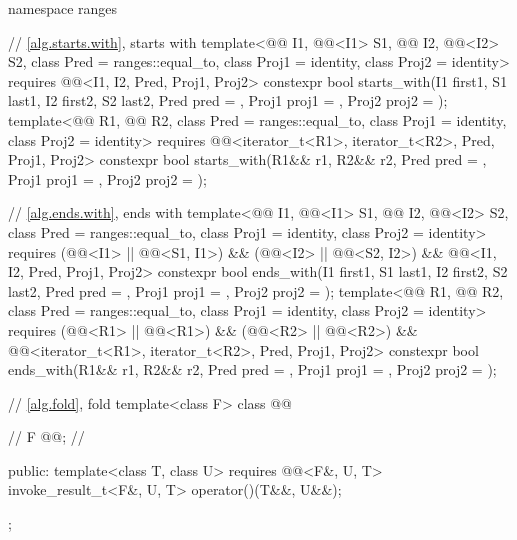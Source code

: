 \begin{codeblock}
{  namespace ranges {
    // \ref{alg.starts.with}, starts with
    template<@@ I1, @@<I1> S1, @@ I2, @@<I2> S2,
             class Pred = ranges::equal_to, class Proj1 = identity, class Proj2 = identity>
      requires @@<I1, I2, Pred, Proj1, Proj2>
      constexpr bool starts_with(I1 first1, S1 last1, I2 first2, S2 last2, Pred pred = {},
                                 Proj1 proj1 = {}, Proj2 proj2 = {});
    template<@@ R1, @@ R2, class Pred = ranges::equal_to,
             class Proj1 = identity, class Proj2 = identity>
      requires @@<iterator_t<R1>, iterator_t<R2>, Pred, Proj1, Proj2>
      constexpr bool starts_with(R1&& r1, R2&& r2, Pred pred = {},
                                 Proj1 proj1 = {}, Proj2 proj2 = {});

    // \ref{alg.ends.with}, ends with
    template<@@ I1, @@<I1> S1, @@ I2, @@<I2> S2,
             class Pred = ranges::equal_to, class Proj1 = identity, class Proj2 = identity>
      requires (@@<I1> || @@<S1, I1>) &&
               (@@<I2> || @@<S2, I2>) &&
               @@<I1, I2, Pred, Proj1, Proj2>
      constexpr bool ends_with(I1 first1, S1 last1, I2 first2, S2 last2, Pred pred = {},
                               Proj1 proj1 = {}, Proj2 proj2 = {});
    template<@@ R1, @@ R2, class Pred = ranges::equal_to,
             class Proj1 = identity, class Proj2 = identity>
      requires (@@<R1> || @@<R1>) &&
               (@@<R2> || @@<R2>) &&
               @@<iterator_t<R1>, iterator_t<R2>, Pred, Proj1, Proj2>
      constexpr bool ends_with(R1&& r1, R2&& r2, Pred pred = {},
                               Proj1 proj1 = {}, Proj2 proj2 = {});

    // \ref{alg.fold}, fold
    template<class F>
    class @@ {     // \expos
      F @@;              // \expos

    public:
      template<class T, class U> requires @@<F&, U, T>
      invoke_result_t<F&, U, T> operator()(T&&, U&&);
    };

}}
\end{codeblock}

